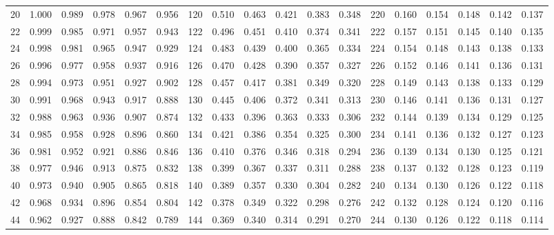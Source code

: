\begin{table}[H]
\begin{tabular}{c|ccccc|c|ccccc|c|ccccc}
	    20      & 1.000 & 0.989 & 0.978 & 0.967 & 0.956 &     120     & 0.510 & 0.463 & 0.421 & 0.383 & 0.348 &     220     & 0.160 & 0.154 & 0.148 & 0.142 & 0.137 \\
	    22      & 0.999 & 0.985 & 0.971 & 0.957 & 0.943 &     122     & 0.496 & 0.451 & 0.410 & 0.374 & 0.341 &     222     & 0.157 & 0.151 & 0.145 & 0.140 & 0.135 \\
	    24      & 0.998 & 0.981 & 0.965 & 0.947 & 0.929 &     124     & 0.483 & 0.439 & 0.400 & 0.365 & 0.334 &     224     & 0.154 & 0.148 & 0.143 & 0.138 & 0.133 \\
	    26      & 0.996 & 0.977 & 0.958 & 0.937 & 0.916 &     126     & 0.470 & 0.428 & 0.390 & 0.357 & 0.327 &     226     & 0.152 & 0.146 & 0.141 & 0.136 & 0.131 \\
	    28      & 0.994 & 0.973 & 0.951 & 0.927 & 0.902 &     128     & 0.457 & 0.417 & 0.381 & 0.349 & 0.320 &     228     & 0.149 & 0.143 & 0.138 & 0.133 & 0.129 \\
	    30      & 0.991 & 0.968 & 0.943 & 0.917 & 0.888 &     130     & 0.445 & 0.406 & 0.372 & 0.341 & 0.313 &     230     & 0.146 & 0.141 & 0.136 & 0.131 & 0.127 \\
	    32      & 0.988 & 0.963 & 0.936 & 0.907 & 0.874 &     132     & 0.433 & 0.396 & 0.363 & 0.333 & 0.306 &     232     & 0.144 & 0.139 & 0.134 & 0.129 & 0.125 \\
	    34      & 0.985 & 0.958 & 0.928 & 0.896 & 0.860 &     134     & 0.421 & 0.386 & 0.354 & 0.325 & 0.300 &     234     & 0.141 & 0.136 & 0.132 & 0.127 & 0.123 \\
	    36      & 0.981 & 0.952 & 0.921 & 0.886 & 0.846 &     136     & 0.410 & 0.376 & 0.346 & 0.318 & 0.294 &     236     & 0.139 & 0.134 & 0.130 & 0.125 & 0.121 \\
	    38      & 0.977 & 0.946 & 0.913 & 0.875 & 0.832 &     138     & 0.399 & 0.367 & 0.337 & 0.311 & 0.288 &     238     & 0.137 & 0.132 & 0.128 & 0.123 & 0.119 \\
	    40      & 0.973 & 0.940 & 0.905 & 0.865 & 0.818 &     140     & 0.389 & 0.357 & 0.330 & 0.304 & 0.282 &     240     & 0.134 & 0.130 & 0.126 & 0.122 & 0.118 \\
	    42      & 0.968 & 0.934 & 0.896 & 0.854 & 0.804 &     142     & 0.378 & 0.349 & 0.322 & 0.298 & 0.276 &     242     & 0.132 & 0.128 & 0.124 & 0.120 & 0.116 \\
	    44      & 0.962 & 0.927 & 0.888 & 0.842 & 0.789 &     144     & 0.369 & 0.340 & 0.314 & 0.291 & 0.270 &     244     & 0.130 & 0.126 & 0.122 & 0.118 & 0.114 \\

\end{tabular}
\end{table}
